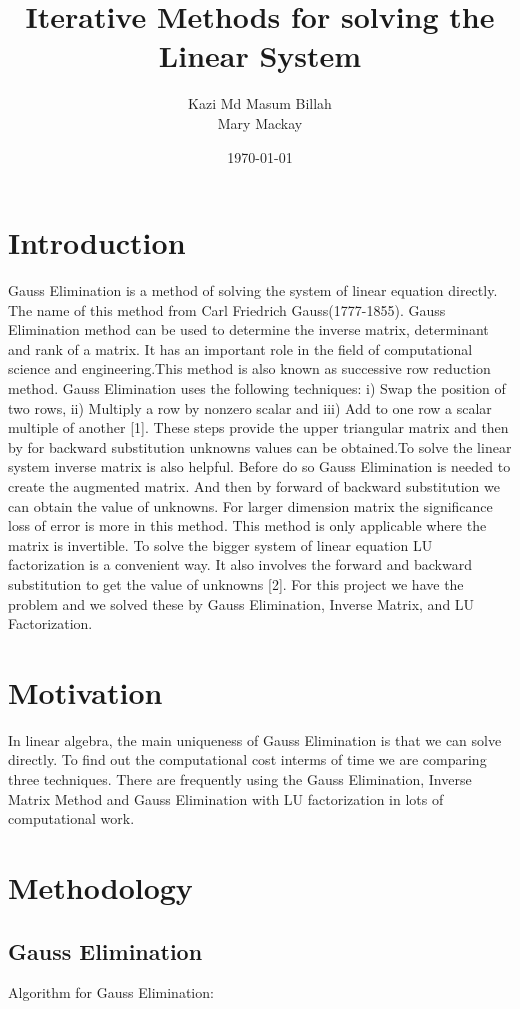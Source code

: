 \documentclass[a4paper, 10pt]{article}
\title{Iterative Methods for solving the Linear System} %
\author{Kazi Md Masum Billah\\ Mary Mackay} %
\date{\today} %
\begin{document}
\maketitle

\section{Introduction}
%
Gauss Elimination is a method of solving the system of linear equation directly. The name of this method from Carl Friedrich Gauss(1777-1855). Gauss Elimination method can be used to determine the inverse matrix, determinant and rank of a matrix. It has an important role in the field of computational science and engineering.This method is also known as successive row reduction method. Gauss Elimination uses the following techniques: i) Swap the position of two rows, ii) Multiply a row by nonzero scalar and iii) Add to one row a scalar multiple of another [1]. These steps provide the upper triangular matrix and then by for backward substitution unknowns values can be obtained.To solve the linear system inverse matrix is also helpful. Before do so Gauss Elimination is needed to create the augmented matrix. And then by forward of backward substitution we can obtain the value of unknowns. For larger dimension matrix the significance loss of error is more in this method. This method is only applicable where the matrix is invertible. To solve the bigger system of linear equation LU factorization is a convenient way. It also involves the forward and backward substitution to get the value of unknowns [2]. For this project we have the problem and we solved these by Gauss Elimination, Inverse Matrix, and LU Factorization.

\section{Motivation}
%
In linear algebra, the main uniqueness of Gauss Elimination is that we can solve directly. To find out the computational cost interms of time we are comparing three techniques. There are frequently using the Gauss Elimination, Inverse Matrix Method and Gauss Elimination with LU factorization in lots of computational work. 

%
\section{Methodology}
%
\subsection{Gauss Elimination}
%
Algorithm for Gauss Elimination:
\end{document}
